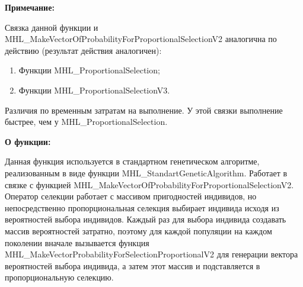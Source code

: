 \documentclass[a4paper,12pt]{article}
\begin{document}
\textbf{Примечание:}

Связка данной функции и MHL\_MakeVectorOfProbabilityForProportionalSelectionV2 аналогична по действию (результат действия аналогичен):
 
 \begin{enumerate}
\item Функции MHL\_ProportionalSelection;
\item Функции MHL\_ProportionalSelectionV3.
 \end{enumerate}
 
 Различия по временным затратам на выполнение. У этой связки выполнение быстрее, чем у MHL\_ProportionalSelection.
  
\textbf{О функции:}

 Данная функция используется в стандартном генетическом алгоритме, реализованным в виде функции MHL\_StandartGeneticAlgorithm. Работает в связке с функцией MHL\_MakeVectorOfProbabilityForProportionalSelectionV2. Оператор селекции работает с массивом пригодностей индивидов, но непосредственно пропорциональная селекция выбирает индивида исходя из вероятностей выбора индивидов. Каждый раз для выбора индивида создавать массив вероятностей затратно, поэтому для каждой популяции на каждом поколении вначале вызывается функция MHL\_MakeVectorProbabilityForSelectionProportionalV2 для генерации вектора вероятностей выбора индивида, а затем этот массив и подставляется в пропорциональную селекцию.
\end{document}
